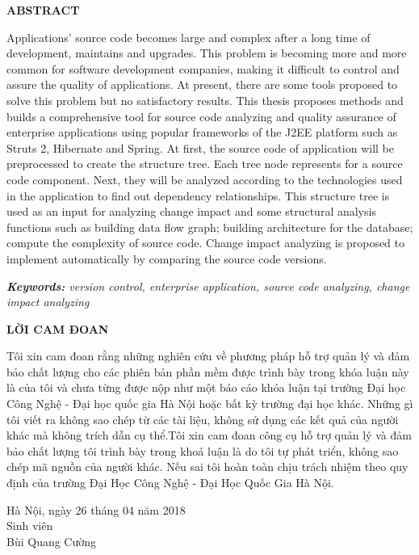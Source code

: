 \documentclass[12pt]{report}
\begin{document}
\newpage
\begin{titlepage}
\begin{center}
	\textbf{\large ABSTRACT}
\end{center}
Applications' source code becomes large and complex after a long time of development, maintains and upgrades. This problem is becoming more and more common for software development companies, making it difficult to control and assure the quality of applications. At present, there are some tools proposed to solve this problem but no satisfactory results. This thesis proposes methods and builds a comprehensive tool for source code analyzing and quality assurance of enterprise applications using popular frameworks of the J2EE platform such as Struts 2, Hibernate and Spring. At first, the source code of application will be preprocessed to create the structure tree. Each tree node represents for a source code component. Next, they will be analyzed according to the technologies used in the application to find out dependency relationships. This structure tree is used as an input for analyzing change impact and some structural analysis functions such as building data flow graph; building architecture for the database; compute the complexity of source code. Change impact analyzing is proposed to implement automatically by comparing the source code versions.

\noindent \textit{\textbf{Keywords:} version control, enterprise application, source code analyzing, change impact analyzing}
\end{titlepage}

\newpage
\begin{titlepage}
\begin{center}
	\textbf{\large LỜI CAM ĐOAN}
\end{center}
Tôi xin cam đoan rằng những nghiên cứu về phương pháp hỗ trợ quản lý và đảm bảo chất lượng cho các phiên bản phần mềm được trình bày trong khóa luận này là của tôi và chưa từng được nộp như một báo cáo khóa luận tại trường Đại học Công Nghệ - Đại học quốc gia Hà Nội hoặc bất kỳ trường đại học khác. Những gì tôi viết ra không sao chép từ các tài liệu, không sử dụng các kết quả của người khác mà không trích dẫn cụ thể.Tôi xin cam đoan công cụ hỗ trợ quản lý và đảm bảo chất lượng tôi trình bày trong khoá luận là do tôi tự phát triển, không sao chép mã nguồn của người khác. Nếu sai tôi hoàn toàn chịu trách nhiệm theo quy định của trường Đại Học Công Nghệ - Đại Học Quốc Gia Hà Nội.\\

\begin{flushright}
	\begin{varwidth}{\linewidth}\centering
		Hà Nội, ngày 26 tháng 04 năm 2018\\
		Sinh viên\\[2cm]
		Bùi Quang Cường
	\end{varwidth}
\end{flushright}
\end{titlepage}
\end{document}
